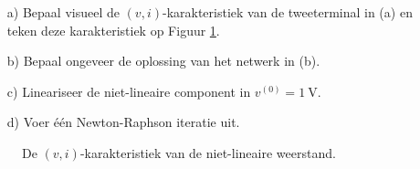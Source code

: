 \documentclass[kulak]{kulakarticle}
\begin{document}
	\begin{enumerate}
		\item[a)] Bepaal visueel de \((v,i)\)-karakteristiek van de tweeterminal in (a) en teken deze karakteristiek op Figuur \ref{fig:nietlineair}.
		\item[b)] Bepaal ongeveer de oplossing van het netwerk in (b).
		\item[c)] Lineariseer de niet-lineaire component in \(v^{(0)}=\SI{1}{\volt}\).
		\item[d)] Voer één Newton-Raphson iteratie uit.
	\end{enumerate}

	\vspace{1cm}

	\begin{figure}[h!]
		\centering
		\caption{De \((v,i)\)-karakteristiek van de niet-lineaire weerstand.}
		\label{fig:nietlineair}
	\end{figure}
\end{document}
